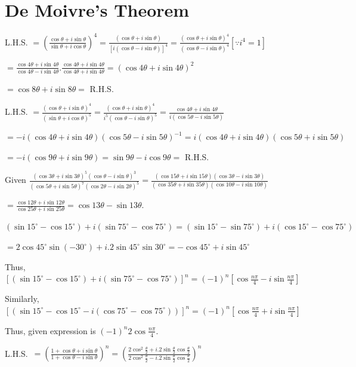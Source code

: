 \chapter{De Moivre's Theorem}
\startitemize[n, 1*broad]
\item L.H.S. $= \left(\frac{\cos\theta + i\sin\theta}{\sin\theta + i\cos\theta}\right)^4 = \frac{(\cos\theta
    + i\sin\theta)}{[i(\cos\theta - i\sin\theta)]^4} = \frac{(\cos\theta + i\sin\theta)^4}{(\cos\theta -
    i\sin\theta)^4}[\because i^4 = 1]$

  $= \frac{\cos4\theta + i\sin4\theta}{\cos4\theta - i\sin4\theta}.\frac{\cos4\theta +
    i\sin4\theta}{\cos4\theta + i\sin4\theta} = (\cos4\theta + i\sin4\theta)^2$

  $= \cos8\theta + i\sin8\theta =$ R.H.S.
\item L.H.S. $= \frac{(\cos\theta + i\sin\theta)^4}{(\sin\theta + i\cos\theta)^5} = \frac{(\cos\theta +
    i\sin\theta)^4}{i^5(\cos\theta - i\sin\theta)^5} = \frac{\cos4\theta + i\sin4\theta}{i(\cos5\theta -
    i\sin5\theta)}$

  $= -i(\cos4\theta + i\sin4\theta)(\cos5\theta - i\sin5\theta)^{-1} = i(\cos4\theta +
  i\sin4\theta)(\cos5\theta + i\sin5\theta)$

  $= -i(\cos9\theta + i\sin9\theta) = \sin9\theta - i\cos9\theta =$ R.H.S.
\item Given $\frac{(\cos3\theta + i\sin3\theta)^5(\cos\theta - i\sin\theta)^3}{(\cos5\theta +
  i\sin5\theta)^7(\cos2\theta - i\sin2\theta)^5} = \frac{(\cos15\theta + i\sin15\theta)(\cos3\theta -
  i\sin3\theta)}{(\cos35\theta + i\sin35\theta)(\cos10\theta - i\sin10\theta)}$

$= \frac{\cos12\theta + i\sin12\theta}{\cos25\theta + i\sin25\theta} = \cos13\theta - \sin13\theta$.
\item $(\sin15^\circ - \cos15^\circ) + i(\sin75^\circ - \cos75^\circ) = (\sin15^\circ - \sin75^\circ) +
  i(\cos15^\circ - \cos75^\circ)$

  $= 2\cos45^\circ\sin(-30^\circ) + i.2\sin45^\circ\sin30^\circ = -\cos45^\circ + i\sin45^\circ$

  Thus, $[(\sin15^\circ - \cos15^\circ) + i(\sin75^\circ - \cos75^\circ)]^n = (-1)^n\left[\cos\frac{n\pi}{4}
    - i\sin\frac{n\pi}{4}\right]$

  Similarly, $[(\sin15^\circ - \cos15^\circ - i(\cos75^\circ - \cos75^\circ))]^n =
  (-1)^n\left[\cos\frac{n\pi}{4} + i\sin\frac{n\pi}{4}\right]$

  Thus, given expression is $(-1)^n2\cos\frac{n\pi}{4}$.
\item L.H.S.\ $= \left(\frac{1 + \cos\theta + i\sin\theta}{1 + \cos\theta - i\sin\theta}\right)^n =
  \left(\frac{2\cos^2\frac{\theta}{2} + i.2\sin\frac{\theta}{2}\cos\frac{\theta}{2}}{2\cos^2\frac{\theta}{2}
      - i.2\sin\frac{\theta}{2}\cos\frac{\theta}{2}}\right)^n$

